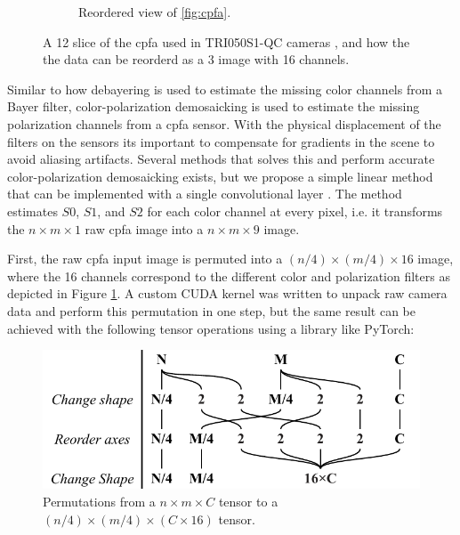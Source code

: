 \begin{figure}[H]
\begin{subfigure}[B]{.48\textwidth}
        \caption{Reordered view of \ref{fig:cpfa}. \label{fig:cpfa_reorder}}
    \end{subfigure}
    \caption{A 12 slice of the \gls{cpfa} used in TRI050S1-QC cameras \cite{lucidvisionlabsTritonMPPolarized2020}, and how the the data can be reorderd as a 3 image with 16 channels. \label{fig:polarization_sensor}}
\end{figure}%

\pagebreak
Similar to how debayering is used to estimate the missing color channels from a Bayer filter, color-polarization demosaicking is used to estimate the missing polarization channels from a \gls{cpfa} sensor.
With the physical displacement of the filters on the sensors its important to compensate for gradients in the scene to avoid aliasing artifacts.
Several methods that solves this and perform accurate color-polarization demosaicking exists, but we propose a simple linear method that can be implemented with a single convolutional layer \cite{morimatsuMonochromeColorPolarization2020}\cite{morimatsuMonochromeColorPolarization2021}\cite{nguyenTwoStepColorPolarizationDemosaicking2022a}.
The method estimates $S0$, $S1$, and $S2$ for each color channel at every pixel, i.e. it transforms the $n \times m \times 1$ raw \gls{cpfa} image into a $n \times m \times 9$ image.

First, the raw \gls{cpfa} input image is permuted into a $(n/4) \times (m/4) \times 16$ image, where the 16 channels correspond to the different color and polarization filters as depicted in Figure \ref{fig:cpfa_reorder}.
A custom CUDA kernel was written to unpack raw camera data and perform this permutation in one step, but the same result can be achieved with the following tensor operations using a library like PyTorch:
\begin{figure}[H]
    \centering
    \includegraphics[width=.6\textwidth]{figures/transformation.pdf}
    \caption{Permutations from a $n \times m \times C $ tensor to a $(n/4) \times (m/4) \times (C\times 16)$ tensor. \label{fig:reorder_operations}}
    
\end{figure}%

